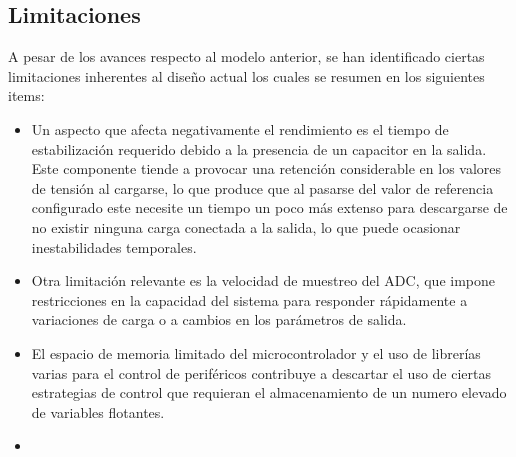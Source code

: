 \subsection{Limitaciones} \label{S:limitaciones} 
A pesar de los avances respecto al modelo anterior, se han identificado ciertas limitaciones inherentes al diseño actual los cuales se resumen en los siguientes items:  
\begin{itemize}
    \item Un aspecto que afecta negativamente el rendimiento es el tiempo de estabilización requerido debido a la presencia de un capacitor en la salida. Este componente tiende a provocar una retención considerable en los valores de tensión al cargarse, lo que produce que al pasarse del valor de referencia configurado este necesite un tiempo un poco más extenso para descargarse de no existir ninguna carga conectada a la salida, lo que puede ocasionar inestabilidades temporales. 
    \item Otra limitación relevante es la velocidad de muestreo del ADC, que impone restricciones en la capacidad del sistema para responder rápidamente a variaciones de carga o a cambios en los parámetros de salida.
    \item El espacio de memoria limitado del microcontrolador  y el uso de librerías varias para el control de periféricos contribuye a descartar el uso de ciertas estrategias de control que requieran el almacenamiento de un numero elevado de variables flotantes.   
    \item 
\end{itemize}


